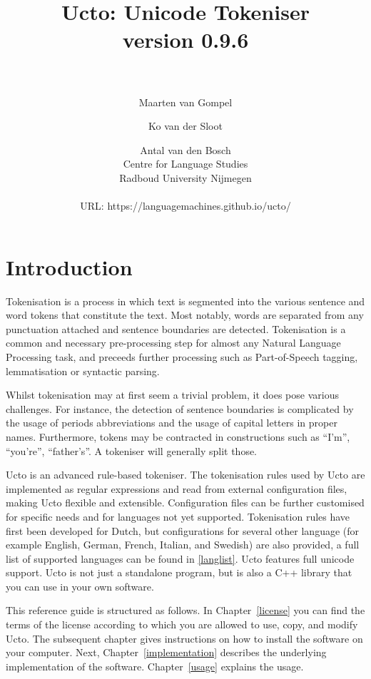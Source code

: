 \documentclass[a4paper,12pt]{report}
\author{Maarten van Gompel \and Ko van der Sloot \and Antal van den Bosch \\
        Centre for Language Studies \\
        Radboud University Nijmegen \\ \\
        URL: https://languagemachines.github.io/ucto/}
\title{{\huge Ucto: Unicode Tokeniser} \\ \vspace*{0.5cm}
{\bf version 0.9.6} \\ \vspace*{0.5cm}{\huge Reference Guide}\\
\vspace*{1cm}} %
\begin{document}

\maketitle

\tableofcontents

\chapter*{Introduction}

Tokenisation is a process in which text is segmented into the various sentence and word tokens that constitute the text. Most notably, words are separated from any punctuation attached and sentence boundaries are detected. Tokenisation is a common and necessary pre-processing step for almost any Natural Language Processing task, and preceeds further processing such as Part-of-Speech tagging, lemmatisation or syntactic parsing.

Whilst tokenisation may at first seem a trivial problem, it does pose various challenges. For instance, the detection of sentence boundaries is complicated by the usage of periods abbreviations and the usage of capital letters in proper names. Furthermore, tokens may be contracted in constructions such as ``I'm'', ``you're'', ``father's''. A tokeniser will generally split those.

Ucto is an advanced rule-based tokeniser. The tokenisation rules used by Ucto are implemented as regular expressions and read from external configuration files, making Ucto flexible and extensible. Configuration files can be further customised for specific needs and for languages not yet supported. Tokenisation rules have first been developed for Dutch, but configurations for several other language (for example English, German, French, Italian, and Swedish) are also provided, a full list of supported languages can be found  in \ref{langlist}. Ucto features full unicode support. Ucto is not just a standalone program, but is also a C++ library that you can use in your own software.

This reference guide is structured as follows. In Chapter~\ref{license} you can find the terms of the license according to which you are allowed to use, copy, and modify Ucto. The subsequent chapter gives instructions on how to install the software on your computer.  Next, Chapter~\ref{implementation} describes the underlying implementation of the software. Chapter~\ref{usage} explains the usage.
\end{document}
